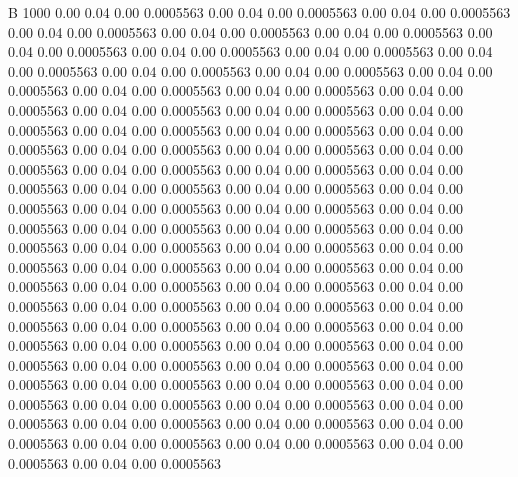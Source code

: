 


B 1000
   0.00    0.04    0.00   0.0005563
   0.00    0.04    0.00   0.0005563
   0.00    0.04    0.00   0.0005563
   0.00    0.04    0.00   0.0005563
   0.00    0.04    0.00   0.0005563
   0.00    0.04    0.00   0.0005563
   0.00    0.04    0.00   0.0005563
   0.00    0.04    0.00   0.0005563
   0.00    0.04    0.00   0.0005563
   0.00    0.04    0.00   0.0005563
   0.00    0.04    0.00   0.0005563
   0.00    0.04    0.00   0.0005563
   0.00    0.04    0.00   0.0005563
   0.00    0.04    0.00   0.0005563
   0.00    0.04    0.00   0.0005563
   0.00    0.04    0.00   0.0005563
   0.00    0.04    0.00   0.0005563
   0.00    0.04    0.00   0.0005563
   0.00    0.04    0.00   0.0005563
   0.00    0.04    0.00   0.0005563
   0.00    0.04    0.00   0.0005563
   0.00    0.04    0.00   0.0005563
   0.00    0.04    0.00   0.0005563
   0.00    0.04    0.00   0.0005563
   0.00    0.04    0.00   0.0005563
   0.00    0.04    0.00   0.0005563
   0.00    0.04    0.00   0.0005563
   0.00    0.04    0.00   0.0005563
   0.00    0.04    0.00   0.0005563
   0.00    0.04    0.00   0.0005563
   0.00    0.04    0.00   0.0005563
   0.00    0.04    0.00   0.0005563
   0.00    0.04    0.00   0.0005563
   0.00    0.04    0.00   0.0005563
   0.00    0.04    0.00   0.0005563
   0.00    0.04    0.00   0.0005563
   0.00    0.04    0.00   0.0005563
   0.00    0.04    0.00   0.0005563
   0.00    0.04    0.00   0.0005563
   0.00    0.04    0.00   0.0005563
   0.00    0.04    0.00   0.0005563
   0.00    0.04    0.00   0.0005563
   0.00    0.04    0.00   0.0005563
   0.00    0.04    0.00   0.0005563
   0.00    0.04    0.00   0.0005563
   0.00    0.04    0.00   0.0005563
   0.00    0.04    0.00   0.0005563
   0.00    0.04    0.00   0.0005563
   0.00    0.04    0.00   0.0005563
   0.00    0.04    0.00   0.0005563
   0.00    0.04    0.00   0.0005563
   0.00    0.04    0.00   0.0005563
   0.00    0.04    0.00   0.0005563
   0.00    0.04    0.00   0.0005563
   0.00    0.04    0.00   0.0005563
   0.00    0.04    0.00   0.0005563
   0.00    0.04    0.00   0.0005563
   0.00    0.04    0.00   0.0005563
   0.00    0.04    0.00   0.0005563
   0.00    0.04    0.00   0.0005563
   0.00    0.04    0.00   0.0005563
   0.00    0.04    0.00   0.0005563
   0.00    0.04    0.00   0.0005563
   0.00    0.04    0.00   0.0005563
   0.00    0.04    0.00   0.0005563
   0.00    0.04    0.00   0.0005563
   0.00    0.04    0.00   0.0005563
   0.00    0.04    0.00   0.0005563
   0.00    0.04    0.00   0.0005563
   0.00    0.04    0.00   0.0005563
   0.00    0.04    0.00   0.0005563
